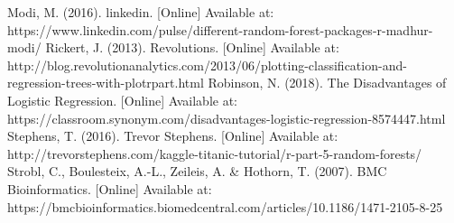 \documentclass{article}
\begin{document}
\begin{thebibliography}{9}
Modi, M. (2016). linkedin. [Online] 
Available at: https://www.linkedin.com/pulse/different-random-forest-packages-r-madhur-modi/
Rickert, J. (2013). Revolutions. [Online] 
Available at:
\footnotesize http://blog.revolutionanalytics.com/2013/06/plotting-classification-and-regression-trees-with-plotrpart.html
Robinson, N. (2018). The Disadvantages of Logistic Regression. [Online] 
Available at:
\footnotesize https://classroom.synonym.com/disadvantages-logistic-regression-8574447.html
Stephens, T. (2016). Trevor Stephens. [Online] 
Available at: 
\footnotesize http://trevorstephens.com/kaggle-titanic-tutorial/r-part-5-random-forests/
Strobl, C., Boulesteix, A.-L., Zeileis, A. \& Hothorn, T. (2007). BMC Bioinformatics. [Online] 
Available at: \footnotesize https://bmcbioinformatics.biomedcentral.com/articles/10.1186/1471-2105-8-25


\end{thebibliography}
\end{document}
